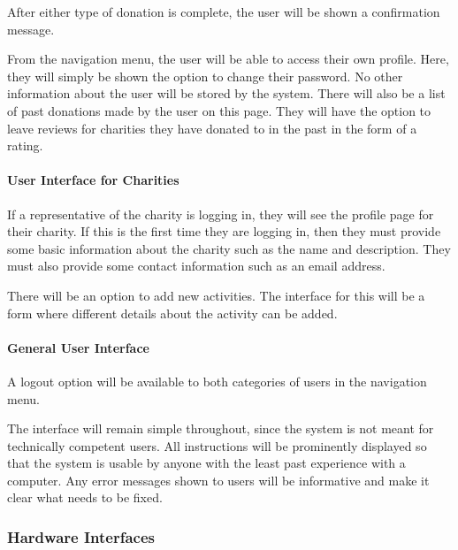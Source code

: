 \documentclass{scrreprt}
\begin{document}
                After either type of donation is complete, the user will be shown a confirmation message.\par
    
                From the navigation menu, the user will be able to access their own profile. Here, they will simply be shown the option to change their password. No other information about the user will be stored by the system. There will also be a list of past donations made by the user on this page. They will have the option to leave reviews for charities they have donated to in the past in the form of a rating.
    
                \paragraph{User Interface for Charities}\mbox{}\par
    
                If a representative of the charity is logging in, they will see the profile page for their charity. If this is the first time they are logging in, then they must provide some basic information about the charity such as the name and description. They must also provide some contact information such as an email address.\par
    
                There will be an option to add new activities. The interface for this will be a form where different details about the activity can be added.
    
                \paragraph{General User Interface}\mbox{}\par
    
                A logout option will be available to both categories of users in the navigation menu.\par
    
                The interface will remain simple throughout, since the system is not meant for technically competent users. All instructions will be prominently displayed so that the system is usable by anyone with the least past experience with a computer. Any error messages shown to users will be informative and make it clear what needs to be fixed.

            \subsubsection{Hardware Interfaces}
            
\end{document}
